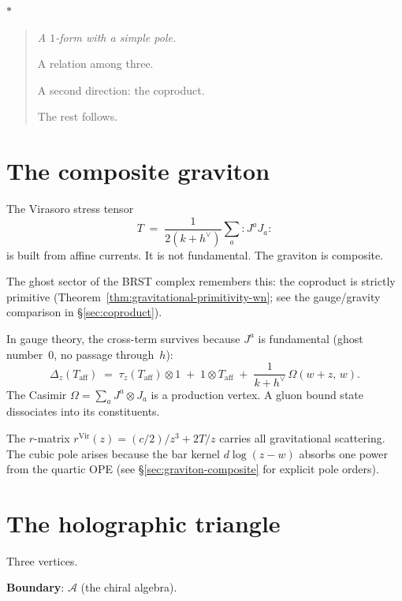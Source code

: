 \documentclass[11pt]{article}
\newcommand{\cA}{\mathcal{A}}
\newcommand{\normord}[1]{:\!#1\!:}
\newcommand{\sep}{\bigskip\begin{center}$*$\end{center}\medskip}
\begin{document}
\sep

\begin{quote}\itshape
A $1$-form with a simple pole.

A relation among three.

A second direction: the coproduct.

The rest follows.
\end{quote}


\section{The composite graviton}
\label{sec:composite-graviton}

The Virasoro stress tensor
\[
T \;=\; \frac{1}{2(k+h^\vee)}\sum_a \normord{J^a J_a}
\]
is built from affine currents.  It is not fundamental.  The
graviton is composite.

The ghost sector of the BRST complex remembers this: the
coproduct is strictly primitive
(Theorem~\ref{thm:gravitational-primitivity-wn}; see the
gauge/gravity comparison in \S\ref{sec:coproduct}).

In gauge theory, the cross-term survives because $J^a$ is
fundamental (ghost number~$0$, no passage through~$h$):
\[
\Delta_z(T_{\mathrm{aff}}) \;=\;
\tau_z(T_{\mathrm{aff}}) \otimes 1
\;+\; 1 \otimes T_{\mathrm{aff}}
\;+\; \frac{1}{k+h^\vee}\,\Omega(w{+}z,\, w).
\]
The Casimir $\Omega = \sum_a J^a \otimes J_a$ is a production
vertex.  A gluon bound state dissociates into its constituents.

The $r$-matrix $r^{\mathrm{Vir}}(z) = (c/2)/z^3 + 2T/z$ carries
all gravitational scattering.  The cubic pole arises because
the bar kernel $d\log(z-w)$ absorbs one power from the quartic
OPE (see \S\ref{sec:graviton-composite} for explicit pole orders).


\section{The holographic triangle}
\label{sec:holographic-triangle}

Three vertices.

\medskip

\noindent
\textbf{Boundary}: $\cA$ (the chiral algebra).
\end{document}
